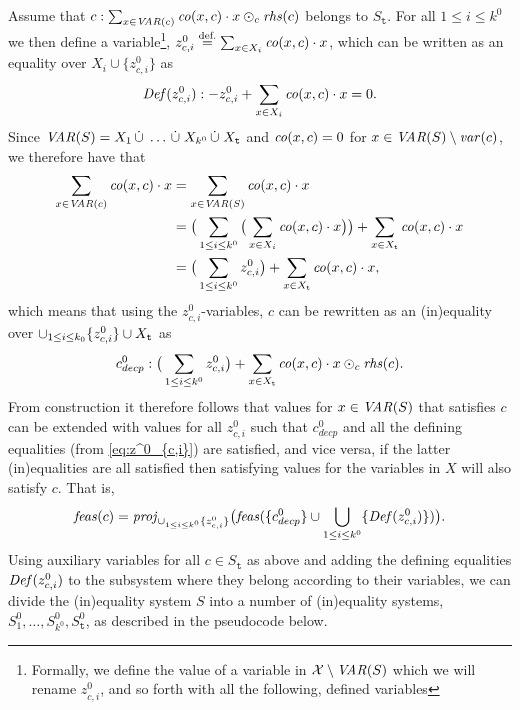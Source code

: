 Assume that $c:\sum_{x\in \mathit{VAR}(c)} \mathit{co}(x,c)\cdot x \odot_c \mathit{rhs}(c)$ belongs to $S_\texttt{t}$.  
For all $1\leq i \leq k^0$ we then define a variable\footnote{{Formally, we define the value of a variable in $\mathcal{X}\setminus \mathit{VAR}(S)$ which we will rename $z^0_{c,i}$, and so forth with all the following, defined variables}}, $z_{c,i}^{0} \overset{\text{def.}}= \sum_{x\in X_i}  \mathit{co}(x,c)\cdot x$, which can be written as an equality over $X_i\cup \{z^0_{c,i}\}$ as
\begin{equation}\label{eq:z^0_{c,i}}
\mathit{Def}(z^0_{c,i}): -z_{c,i}^{0} + \sum_{x\in X_i}  \coef(x,c)\cdot x = 0.
\end{equation}
Since $\mathit{VAR}(S) = X_1 \,\dot{\cup}\; \ldots \,\dot{\cup}\; X_{k^0} \,\dot{\cup}\; X_{\texttt{t}}$ and $\mathit{co}(x,c)=0$ for $x\in \mathit{VAR}(S)\setminus \mathit{var}(c)$, we therefore have that 
\begin{align*}
\sum_{x\in \mathit{VAR}(c)} \mathit{co}(x,c)\cdot x  
&= \sum_{x\in \mathit{VAR}(S)} \mathit{co}(x,c)\cdot x \\
&= \big(\sum_{1\leq i \leq k^0}\big(\sum_{x\in X_i} \mathit{co}(x,c)\cdot x\big)\big) + \sum_{x\in X_{\texttt{t}}}\mathit{co}(x,c)\cdot x\\
&= \big(\sum_{1\leq i\leq k^0}z^0_{c,i}\big)+\sum_{x\in X_\texttt{t}}\mathit{co}(x,c)\cdot x,
\end{align*}
which means that using the $z^0_{c,i}$-variables, $c$ can be rewritten as an (in)equality over $\cup_{1\leq i\leq k_0}\{z^0_{c,i}\}\cup X_{\texttt{t}}$ as  
\begin{equation}\label{transEq}
c^0_{decp}:\big(\sum_{1\leq i \leq k^0} z_{c,i}^{0}\big) + \sum_{x\in X_\texttt{t}}\mathit{co}(x,c)\cdot x \odot_c \mathit{rhs}(c).
\end{equation}
From construction it therefore follows that values for $x\in \mathit{VAR}(S)$ that satisfies $c$ can be extended with values for all $z^0_{c,i}$ such that $c^0_{decp}$ and all the defining equalities (from \eqref{eq:z^0_{c,i}}) are satisfied, and vice versa, if the latter (in)equalities are all satisfied then satisfying values for the variables in $X$ will also satisfy $c$. That is,
\begin{equation}\label{eq:projz}
\mathit{feas}(c)=\mathit{proj}_{\cup_{1\leq i\leq k^0}\{z^0_{c,i}\}}\big(\mathit{feas}(\{c^0_{decp}\}\cup\bigcup_{1\leq i\leq k^0}\{\mathit{Def}(z^0_{c,i})\})\big).
\end{equation}
Using auxiliary variables for all $c\in S_\texttt{t}$ as above and adding the defining equalities $\mathit{Def}(z^0_{c,i})$ to the subsystem where they belong according to their variables, we can divide the (in)equality system $S$ into a number of (in)equality systems, $S^0_1,\ldots, S^0_{k^0}, S^0_\texttt{t}$, 
as described in the pseudocode below. 

